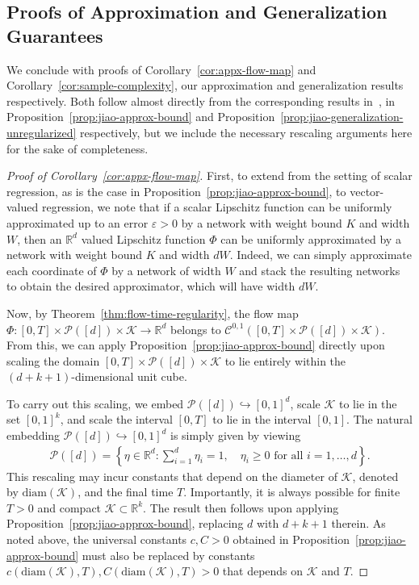 \documentclass[11pt,reqno]{amsart}
\numberwithin{equation}{section}
\theoremstyle{plain}
\newcommand{\R}{\mathbb{R}}
\newcommand{\calC}{{\mathcal C}}
\newcommand{\calK}{{\mathcal K}}
\newcommand{\calP}{{\mathcal P}}
\newcommand{\1}{\boldsymbol{\mathbbm{1}}}
\begin{document}
\subsection{Proofs of Approximation and Generalization Guarantees}
\label{sec:proofs-appx-gen}
We conclude with proofs of Corollary~\ref{cor:appx-flow-map} and Corollary~\ref{cor:sample-complexity}, our approximation and generalization results respectively. Both follow almost directly from the corresponding results in~\cite{Jiao2023}, in Proposition~\ref{prop:jiao-approx-bound} and Proposition~\ref{prop:jiao-generalization-unregularized} respectively, but we include the necessary rescaling arguments here for the sake of completeness.

\begin{proof}[Proof of Corollary~\ref{cor:appx-flow-map}]
First, to extend from the setting of scalar regression, as is the case in Proposition~\ref{prop:jiao-approx-bound}, to vector-valued regression, we note that if a scalar Lipschitz function can be uniformly approximated up to an error $\varepsilon > 0$ by a network with weight bound $K$ and width $W$, then an $\R^d$ valued Lipschitz function $\Phi$ can be uniformly approximated by a network with weight bound $K$ and width $d W$. Indeed, we can simply approximate each coordinate of $\Phi$ by a network of width $W$ and stack the resulting networks to obtain the desired approximator, which will have width $d W$.

Now, by Theorem~\ref{thm:flow-time-regularity}, the flow map $\Phi : [0, T] \times \calP([d]) \times \calK \to \R^d$ belongs to $\calC^{0,1}([0, T] \times \calP([d])\times \calK)$. From this, we can apply Proposition~\ref{prop:jiao-approx-bound} directly upon scaling the domain $[0, T] \times \calP([d])\times \calK$ to lie entirely within the $(d + k +1)$-dimensional unit cube.

To carry out this scaling, we embed $\calP([d]) \hookrightarrow [0, 1]^d$, scale $\calK$ to lie in the set $[0,1]^k$, and scale the interval $[0, T]$ to lie in the interval $[0, 1]$. The natural embedding $\calP([d]) \hookrightarrow [0, 1]^d$ is simply given by viewing
\begin{align*}
    \calP([d]) = \left\{\eta \in \R^d : \sum_{i=1}^d \eta_i = 1, \quad \eta_i \geq 0 \text{ for all } i = 1, \ldots, d\right\}.
\end{align*}
This rescaling may incur constants that depend on the diameter of $\calK$, denoted by $\mathrm{diam}(\calK)$, and the final time $T$. Importantly, it is always possible for finite $T > 0$ and compact $\calK \subset \R^k$. The result then follows upon applying Proposition~\ref{prop:jiao-approx-bound}, replacing $d$ with $d + k + 1$ therein. As noted above, the universal constants $c, C > 0$ obtained in Proposition~\ref{prop:jiao-approx-bound} must also be replaced by constants $c(\mathrm{diam}(\calK), T), C(\mathrm{diam}(\calK), T) > 0$ that depends on $\calK$ and $T$.
\end{proof}
\end{document}
